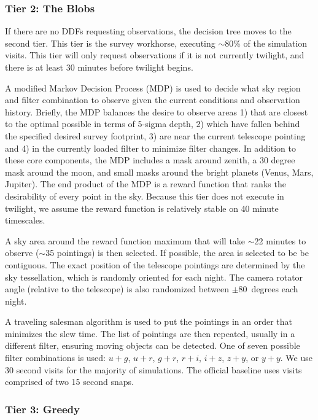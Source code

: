 \subsubsection{Tier 2:  The Blobs}

If there are no DDFs requesting observations, the decision tree moves to the second tier. This tier is the survey workhorse, executing $\sim$80\% of the simulation visits.  This tier will only request observations if it is not currently twilight, and there is at least 30 minutes before twilight begins.

A modified Markov Decision Process (MDP) is used to decide what sky region and filter combination to observe given the current conditions and observation history. Briefly, the MDP balances the desire to observe areas 1) that are closest to the optimal possible in terms of 5-sigma depth, 2) which have fallen behind the specified desired survey footprint, 3) are near the current telescope pointing and 4) in the currently loaded filter to minimize filter changes.  In addition to these core components, the MDP includes a mask around zenith, a 30 degree mask around the moon, and small masks around the bright planets (Venus, Mars, Jupiter). The end product of the MDP is a reward function that ranks the desirability of every point in the sky. Because this tier does not execute in twilight, we assume the reward function is relatively stable on 40 minute timescales.

A sky area around the reward function maximum that will take $\sim$22 minutes to observe ($\sim$35 pointings) is then selected. If possible, the area is selected to be be contiguous.  The exact position of the telescope pointings are determined by the sky tessellation, which is randomly oriented for each night. The camera rotator angle (relative to the telescope) is also randomized between $\pm 80$\ degrees each night.

A traveling salesman algorithm is used to put the pointings in an order that minimizes the slew time. The list of pointings are then repeated, usually in a different filter, ensuring moving objects can be detected.  One of seven possible filter combinations is used: $u+g$, $u+r$, $g+r$, $r+i$, $i+z$, $z+y$, or $y+y$.  We use 30 second visits for the majority of simulations. The official baseline uses visits comprised of two 15 second snaps.  


\subsubsection{Tier 3:  Greedy}

